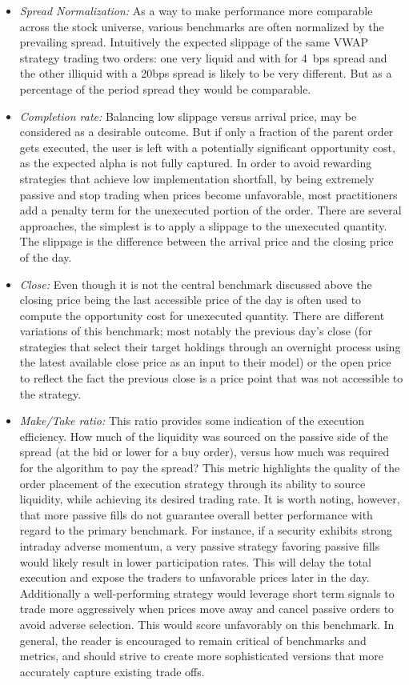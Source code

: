 \begin{itemize}
\item \emph{Spread Normalization:} As a way to make performance more  comparable across the stock universe, various benchmarks are often normalized by the prevailing spread. Intuitively the expected slippage of the same VWAP strategy trading two orders: one very liquid and with for 4~bps spread and the other illiquid with a 20bps spread is likely to be very different. But as a percentage of the period spread they would be comparable. 

\item \emph{Completion rate:} Balancing low slippage versus arrival price, may be considered as a desirable outcome. But if only a fraction of the parent order gets executed, the user is left with a potentially significant opportunity cost, as the expected alpha is not fully captured. In order to avoid rewarding strategies that achieve low implementation shortfall, by being extremely passive and stop trading when prices become unfavorable, most practitioners add a penalty term for the unexecuted portion of the order. There are several approaches, the simplest is to apply a slippage to the unexecuted quantity. The slippage is the difference between the arrival price and the closing price of the day. 

\item \emph{Close:} Even though it is not the central benchmark discussed above the closing price being the last accessible price of the day is often used to compute the opportunity cost for unexecuted quantity. There are different variations of this benchmark; most notably the previous day's close (for strategies that select their target holdings through an overnight process using the latest available close price as an input to their model) or the open price to reflect the fact the previous close is a price point that was not accessible to the strategy.

\item \emph{Make/Take ratio:} This ratio provides some indication of the execution efficiency. How much of the liquidity was sourced on the passive side of the spread (at the bid or lower for a buy order), versus how much was required for the algorithm to pay the spread? This metric highlights the quality of the order placement of the execution strategy through its ability to source liquidity, while achieving its desired trading rate. It is worth noting, however, that more passive fills do not guarantee overall better performance with regard to the primary benchmark. For instance, if a security exhibits strong intraday adverse momentum, a very passive strategy favoring passive fills would likely result in lower participation rates. This will delay the total execution and expose the traders to unfavorable prices later in the day. Additionally a well-performing strategy would leverage short term signals to trade more aggressively when prices move away and cancel passive orders to avoid adverse selection. This would score unfavorably on this benchmark. In general, the reader is encouraged to remain critical of benchmarks and metrics, and should strive to create more sophisticated versions that more accurately capture existing trade offs.


\end{itemize}
